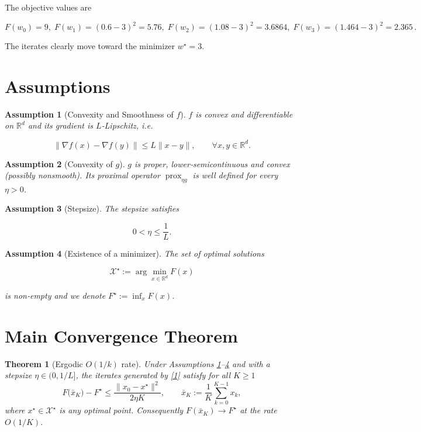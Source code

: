 \documentclass{article}
\newtheorem{theorem}{Theorem}
\newtheorem{assumption}{Assumption}
\newcommand{\prox}{\operatorname{prox}}
\newcommand{\grad}{\nabla}
\newcommand{\R}{\mathbb{R}}
\begin{document}
The objective values are  

\[
F(w_0)=9,\;F(w_1)= (0.6-3)^2=5.76,\;F(w_2)=(1.08-3)^2=3.6864,\;F(w_3)=(1.464-3)^2=2.365\, .
\]

The iterates clearly move toward the minimizer $w^\star=3$.

\section*{Assumptions}
\begin{assumption}[Convexity and Smoothness of $f$]\label{as:convex_smooth}
$f$ is convex and differentiable on $\R^{d}$ and its gradient is $L$‑Lipschitz, i.e.  

\[
\|\grad f(x)-\grad f(y)\|\le L\|x-y\|,\qquad\forall x,y\in\R^{d}.
\tag{A1}
\]
\end{assumption}

\begin{assumption}[Convexity of $g$]\label{as:convex_g}
$g$ is proper, lower‑semicontinuous and convex (possibly nonsmooth).  
Its proximal operator $\prox_{\eta g}$ is well defined for every $\eta>0$.
\end{assumption}

\begin{assumption}[Stepsize]\label{as:stepsize}
The stepsize satisfies  

\[
0<\eta\le\frac{1}{L}.
\tag{A3}
\]
\end{assumption}

\begin{assumption}[Existence of a minimizer]\label{as:optimum}
The set of optimal solutions  

\[
\mathcal X^\star:=\arg\min_{x\in\R^{d}}F(x)
\]

is non‑empty and we denote $F^\star:=\inf_xF(x)$.
\end{assumption}

\section*{Main Convergence Theorem}
\begin{theorem}[Ergodic $O(1/k)$ rate]\label{thm:ergodic}
Under Assumptions \ref{as:convex_smooth}–\ref{as:optimum} and with a stepsize $\eta\in(0,1/L]$, the iterates generated by \eqref{1} satisfy for all $K\ge1$
\[
F\bigl(\bar x_{K}\bigr)-F^\star
\le \frac{\|x_0-x^\star\|^{2}}{2\eta K},
\qquad 
\bar x_{K}:=\frac{1}{K}\sum_{k=0}^{K-1}x_{k},
\tag{4}
\]
where $x^\star\in\mathcal X^\star$ is any optimal point.
Consequently $F(\bar x_K)\to F^\star$ at the rate $O(1/K)$.
\end{theorem}
\end{document}
